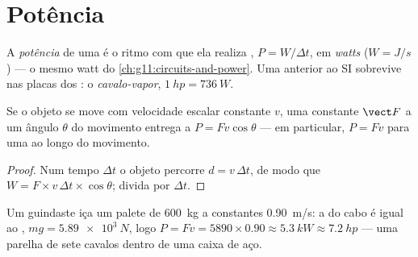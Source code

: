 \section{Potência}

\begin{definition}[Potência]\label{def:g11:work-of-force:power}
A \emph{potência} de uma  é o ritmo com que
ela realiza , $P = W/\Delta t$, em \emph{watts}
($\unit{W} = \unit{J/s}$) --- o mesmo watt do
\cref{ch:g11:circuits-and-power}. Uma  anterior ao SI sobrevive
nas placas dos : o \emph{cavalo-vapor},
$\qty{1}{hp} = \qty{736}{W}$.
\end{definition}

\begin{proposition}\label{prop:g11:work-of-force:pfv}
Se o objeto se move com velocidade escalar constante $v$, uma 
constante $\vect F$ a um ângulo $\theta$ do movimento entrega a 
$P = F v \cos\theta$ --- em particular, $P = Fv$ para uma  ao longo
do movimento.
\end{proposition}

\begin{proof}
Num tempo $\Delta t$ o objeto percorre $d = v\,\Delta t$, de modo que
$W = F \times v\,\Delta t \times \cos\theta$; divida por $\Delta t$.
\end{proof}

\begin{example}[Guindaste]\label{ex:g11:work-of-force:crane}
Um guindaste iça um palete de \qty{600}{kg} a constantes
\qty{0.90}{m/s}: a  do cabo é igual ao ,
$mg = \qty{5.89e3}{N}$, logo
$P = Fv = 5890 \times 0.90 \approx \qty{5.3}{kW} \approx \qty{7.2}{hp}$
--- uma parelha de sete cavalos dentro de uma caixa de aço.
\end{example}

